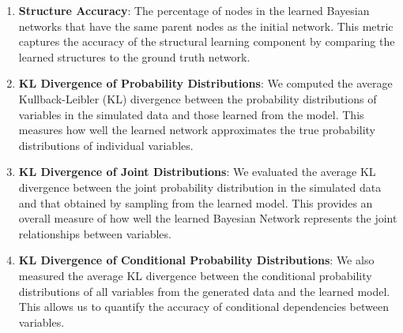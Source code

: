 \begin{enumerate}
    \item \textbf{Structure Accuracy}: The percentage of nodes in the learned Bayesian networks that have the same parent nodes as the initial network. This metric captures the accuracy of the structural learning component by comparing the learned structures to the ground truth network.
   
    \item \textbf{KL Divergence of Probability Distributions}: We computed the average Kullback-Leibler (KL) divergence between the probability distributions of variables in the simulated data and those learned from the model. This measures how well the learned network approximates the true probability distributions of individual variables.

    \item \textbf{KL Divergence of Joint Distributions}: We evaluated the average KL divergence between the joint probability distribution in the simulated data and that obtained by sampling from the learned model. This provides an overall measure of how well the learned Bayesian Network represents the joint relationships between variables.

    \item \textbf{KL Divergence of Conditional Probability Distributions}: We also measured the average KL divergence between the conditional probability distributions of all variables from the generated data and the learned model. This allows us to quantify the accuracy of conditional dependencies between variables.
\end{enumerate}
